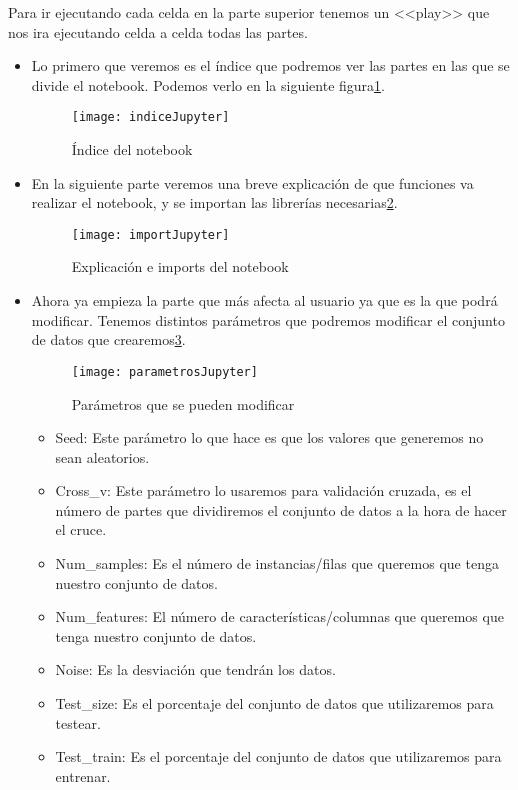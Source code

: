 Para ir ejecutando cada celda en la parte superior tenemos un <<play>> que nos ira ejecutando celda a celda todas las partes.
\begin{itemize}
	\item Lo primero que veremos es el índice que podremos ver las partes en las que se divide el notebook. Podemos verlo en la siguiente figura\ref{fig:indiceJupyter}.
	\begin{figure}
	\centering
	\texttt{[image: indiceJupyter]}
	\caption{Índice del notebook}
	\label{fig:indiceJupyter}
	\end{figure}
	\item En la siguiente parte veremos una breve explicación de que funciones va realizar el notebook, y se importan las librerías necesarias\ref{fig:importJupyter}.
	\begin{figure}
	\centering
	\texttt{[image: importJupyter]}
	\caption{Explicación e imports del notebook}
	\label{fig:importJupyter}
	\end{figure}
	\item Ahora ya empieza la parte que más afecta al usuario ya que es la que podrá modificar. Tenemos distintos parámetros que podremos modificar el conjunto de datos que crearemos\ref{fig:parametrosJupyter}.
	\begin{figure}
	\centering
	\texttt{[image: parametrosJupyter]}
	\caption{Parámetros que se pueden modificar}
	\label{fig:parametrosJupyter}
	\end{figure}
	\begin{itemize}
		\item Seed: Este parámetro lo que hace es que los valores que generemos no sean aleatorios.
		\item Cross\_v: Este parámetro lo usaremos para validación cruzada, es el número de partes que dividiremos el conjunto de datos a la hora de hacer el cruce.
		\item Num\_samples: Es el número de instancias/filas que queremos que tenga nuestro conjunto de datos.
		\item Num\_features: El número de características/columnas que queremos que tenga nuestro conjunto de datos.
		\item Noise: Es la desviación que tendrán los datos.
		\item Test\_size: Es el porcentaje del conjunto de datos que utilizaremos para testear.
		\item Test\_train: Es el porcentaje del conjunto de datos que utilizaremos para entrenar.

\end{itemize}
\end{itemize}
